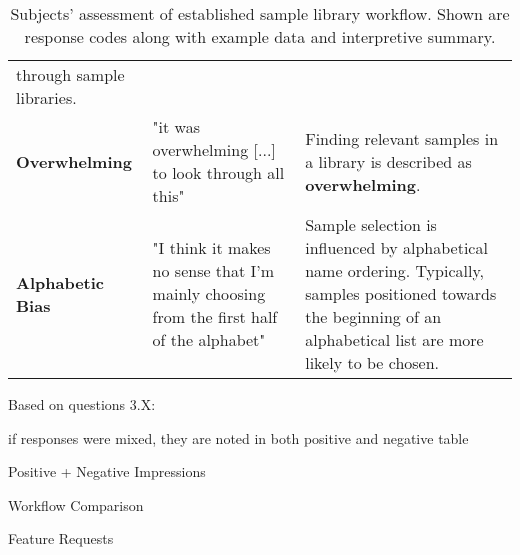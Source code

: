 \begin{table}[!ht]
\begin{tabular}{ p{4.0cm} p{4.75cm} p{4.75cm} }
    through sample libraries.
    \\
    \textbf{Overwhelming}
    &
    "it was overwhelming [...] to look through all this"
    &
    Finding relevant samples in a library is described as \textbf{overwhelming}.
    \\
    \textbf{Alphabetic Bias}
    &
    "I think it makes no sense that I'm mainly choosing from the first half of
    the alphabet"
    &
    Sample selection is influenced by alphabetical name ordering. Typically,
    samples positioned towards the beginning of an alphabetical list are more
    likely to be chosen.
    \\
  \end{tabular}
  \caption[Established Sample Library Workflow Assessment: Response Codes]
  {Subjects' assessment of established sample library workflow. Shown are
  response codes along with example data and interpretive summary.}
  \label{table:current_workflow_assessment}
\end{table}

Based on questions 3.X:

if responses were mixed, they are noted in both positive and negative table

Positive + Negative Impressions

Workflow Comparison

Feature Requests

